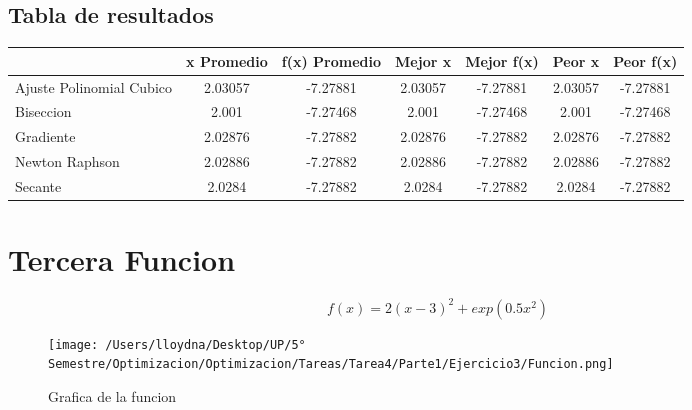 \documentclass{report}
\begin{document}
            \subsection{Tabla de resultados}
            \begin{tabular}{l|c|c|c|c|c|c}
                & x Promedio & f(x) Promedio & Mejor x & Mejor f(x) & Peor x & Peor f(x)\\
                \hline
                Ajuste Polinomial Cubico & 2.03057 & -7.27881 & 2.03057 & -7.27881 & 2.03057 & -7.27881\\
                \hline
                Biseccion & 2.001 & -7.27468 & 2.001 & -7.27468 & 2.001 & -7.27468\\
                \hline
                Gradiente & 2.02876 & -7.27882 & 2.02876 & -7.27882 & 2.02876 & -7.27882\\
                \hline
                Newton Raphson & 2.02886 & -7.27882 & 2.02886 & -7.27882 & 2.02886 & -7.27882\\
                \hline
                Secante & 2.0284 & -7.27882 & 2.0284 & -7.27882 & 2.0284 & -7.27882\\
                \hline
            \end{tabular}
        \pagebreak

        \section{Tercera Funcion}
            \begin{equation*}
                f(x)=2(x-3)^2+exp(0.5x^2)
            \end{equation*}

            \begin{figure}[H]
                \texttt{[image: /Users/lloydna/Desktop/UP/5° Semestre/Optimizacion/Optimizacion/Tareas/Tarea4/Parte1/Ejercicio3/Funcion.png]}
                \caption{Grafica de la funcion}
                \label{fig:fun13}
            \end{figure}
\end{document}
